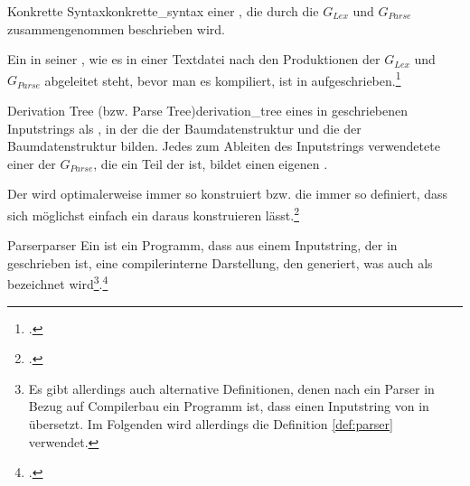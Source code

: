 \begin{Definition}{Konkrette Syntax}{konkrette_syntax}
   einer , die durch die  $G_{Lex}$ und $G_{Parse}$ zusammengenommen beschrieben wird.

  Ein  in seiner , wie es in einer Textdatei nach den Produktionen der  $G_{Lex}$ und $G_{Parse}$ abgeleitet steht, bevor man es kompiliert, ist in  aufgeschrieben.\footcite{g_siek_course_2022}
\end{Definition}

\begin{Definition}{Derivation Tree (bzw. Parse Tree)}{derivation_tree}
   eines in  geschriebenen Inputstrings als , in der  die  der Baumdatenstruktur und  die  der Baumdatenstruktur bilden. Jedes zum Ableiten des Inputstrings verwendetete  einer  der  $G_{Parse}$, die ein Teil der  ist,  bildet einen eigenen .

  Der  wird optimalerweise immer so konstruiert bzw. die  immer so definiert, dass sich möglichst einfach ein  daraus konstruieren lässt.\footcite{noauthor_json_nodate}
\end{Definition}

\begin{Definition}{Parser}{parser}
  Ein  ist ein Programm, dass aus einem Inputstring, der in  geschrieben ist, eine compilerinterne Darstellung, den  generiert, was auch als   bezeichnet wird\footnote{Es gibt allerdings auch alternative Definitionen, denen nach ein Parser in Bezug auf Compilerbau ein Programm ist, dass einen Inputstring von  in   übersetzt. Im Folgenden wird allerdings die Definition \ref{def:parser} verwendet.}.\footcite{noauthor_json_nodate}
\end{Definition}

